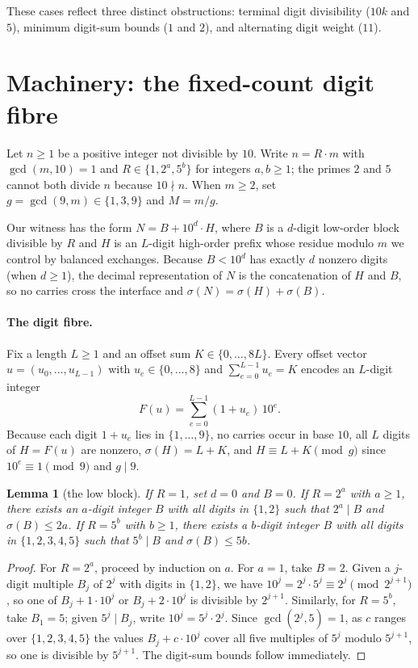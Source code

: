 \documentclass[11pt]{article}
\newtheorem{lemma}[theorem]{Lemma}
\theoremstyle{remark}
\newcommand{\sig}{\sigma}
\begin{document}
These cases reflect three distinct obstructions: terminal digit divisibility
($10k$ and $5$), minimum digit-sum bounds ($1$ and $2$), and alternating digit
weight ($11$).

\section{Machinery: the fixed-count digit fibre}
\label{sec:machinery}

Let $n \ge 1$ be a positive integer not divisible by $10$. Write $n = R\cdot m$
with $\gcd(m,10)=1$ and $R \in \{1, 2^a, 5^b\}$ for integers $a,b \ge 1$; the
primes $2$ and $5$ cannot both divide $n$ because $10 \nmid n$. When $m \ge 2$,
set $g = \gcd(9,m) \in \{1,3,9\}$ and $M = m/g$.

Our witness has the form $N = B + 10^d \cdot H$, where $B$ is a $d$-digit
low-order block divisible by $R$ and $H$ is an $L$-digit high-order prefix
whose residue modulo $m$ we control by balanced exchanges. Because $B < 10^d$
has exactly $d$ nonzero digits (when $d \ge 1$), the decimal representation of
$N$ is the concatenation of $H$ and $B$, so no carries cross the interface and
$\sig(N) = \sig(H) + \sig(B)$.

\paragraph{The digit fibre.} Fix a length $L \ge 1$ and an offset sum
$K \in \{0,\dots,8L\}$. Every offset vector $u = (u_0,\dots,u_{L-1})$ with
$u_e \in \{0,\dots,8\}$ and $\sum_{e=0}^{L-1} u_e = K$ encodes an $L$-digit
integer
\[
 F(u) = \sum_{e=0}^{L-1} (1 + u_e)\,10^e .
\]
Because each digit $1 + u_e$ lies in $\{1,\dots,9\}$, no carries occur in base
$10$, all $L$ digits of $H = F(u)$ are nonzero, $\sig(H) = L + K$, and
$H \equiv L + K \pmod g$ since $10^e \equiv 1 \pmod 9$ and $g \mid 9$.

\begin{lemma}[the low block]
\label{lem:lowblock}
If $R = 1$, set $d = 0$ and $B = 0$. If $R = 2^a$ with $a \ge 1$, there exists
an $a$-digit integer $B$ with all digits in $\{1,2\}$ such that $2^a \mid B$
and $\sig(B) \le 2a$. If $R = 5^b$ with $b \ge 1$, there exists a $b$-digit
integer $B$ with all digits in $\{1,2,3,4,5\}$ such that $5^b \mid B$ and
$\sig(B) \le 5b$.
\end{lemma}

\begin{proof}
For $R = 2^a$, proceed by induction on $a$. For $a = 1$, take $B = 2$. Given a
$j$-digit multiple $B_j$ of $2^j$ with digits in $\{1,2\}$, we have
$10^j = 2^j \cdot 5^j \equiv 2^j \pmod{2^{j+1}}$, so one of $B_j + 1\cdot 10^j$
or $B_j + 2\cdot 10^j$ is divisible by $2^{j+1}$. Similarly, for $R = 5^b$,
take $B_1 = 5$; given $5^j \mid B_j$, write $10^j = 5^j \cdot 2^j$. Since
$\gcd(2^j,5)=1$, as $c$ ranges over $\{1,2,3,4,5\}$ the values
$B_j + c\cdot 10^j$ cover all five multiples of $5^j$ modulo $5^{j+1}$, so one
is divisible by $5^{j+1}$. The digit-sum bounds follow immediately.
\end{proof}
\end{document}
